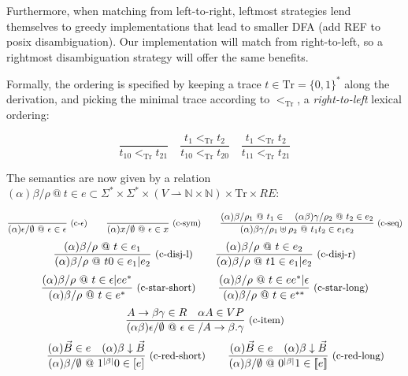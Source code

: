 \documentclass{article}
\begin{document}
Furthermore, when matching from left-to-right, leftmost strategies lend themselves to greedy implementations that lead to smaller DFA (add REF to posix disambiguation). Our implementation will match from right-to-left, so a rightmost disambiguation strategy will offer the same benefits.

Formally, the ordering is specified by keeping a trace $t \in \text{Tr} = \{0,1\}^*$ along the derivation, and picking the minimal trace according to $<_\text{Tr}$, a {\em right-to-left} lexical ordering:

\[
\frac{}{t_10 <_\text{Tr} t_21}
\quad
\frac{t_1 <_\text{Tr} t_2}{t_10 <_\text{Tr} t_20}
\quad
\frac{t_1 <_\text{Tr} t_2}{t_11 <_\text{Tr} t_21}
\]

\newpage

\newcommand\dcre[5]{(#1) #2 / #3\ @\ #4 \in #5}
The semantics are now given by a relation $\dcre{\alpha}{\beta}{\rho}{t}{e} \subset \Sigma^* \times \Sigma^* \times (V \rightharpoonup \mathbb{N}\times\mathbb{N}) \times \text{Tr} \times RE$:

\[
\Rule{}
     {\dcre{\alpha}{\epsilon}{\emptyset}{\epsilon}{\epsilon}}
     {c-$\epsilon$}
\qquad
\Rule{}
     {\dcre{\alpha}{x}{\emptyset}{\epsilon}{x}}
     {c-sym}
\qquad
\Rule{\dcre{\alpha}{\beta}{\rho_1}{t_1}\quad\dcre{\alpha\beta}{\gamma}{\rho_2}{t_2}{e_2}}
     {\dcre{\alpha}{\beta\gamma}{\rho_1\uplus\rho_2}{t_1t_2}{e_1e_2}}
     {c-seq}
\]
\[
\Rule{\dcre{\alpha}{\beta}{\rho}{t}{e_1}}
     {\dcre{\alpha}{\beta}{\rho}{t0}{e_1|e_2}}
     {c-disj-l}
\qquad
\Rule{\dcre{\alpha}{\beta}{\rho}{t}{e_2}}
     {\dcre{\alpha}{\beta}{\rho}{t1}{e_1|e_2}}
     {c-disj-r}
\]
\[
\Rule{\dcre{\alpha}{\beta}{\rho}{t}{\epsilon|ee^*}}
     {\dcre{\alpha}{\beta}{\rho}{t}{e^*}}
     {c-star-short}
\qquad
\Rule{\dcre{\alpha}{\beta}{\rho}{t}{ee^*|\epsilon}}
     {\dcre{\alpha}{\beta}{\rho}{t}{e^{**}}}
     {c-star-long}
\]
\[
\Rule{A \rightarrow \beta \gamma \in R \quad \alpha A \in VP}
     {\dcre{\alpha\beta}{\epsilon}{\emptyset}{\epsilon}{/A\rightarrow \beta.\gamma}}
     {c-item}
\]
\[
\qquad
\Rule{\dre{\alpha}{\vec{B}}{e} \quad \dred{\alpha}{\beta}{\vec{B}}}
     {\dcre{\alpha}{\beta}{\emptyset}{1^{|\beta|}0}{[e]}}
     {c-red-short}
\qquad
\Rule{\dre{\alpha}{\vec{B}}{e} \quad \dred{\alpha}{\beta}{\vec B}}
     {\dcre{\alpha}{\beta}{\emptyset}{0^{|\beta|}1}{[\![e]\!]}}
     {c-red-long}
\]

\end{document}
